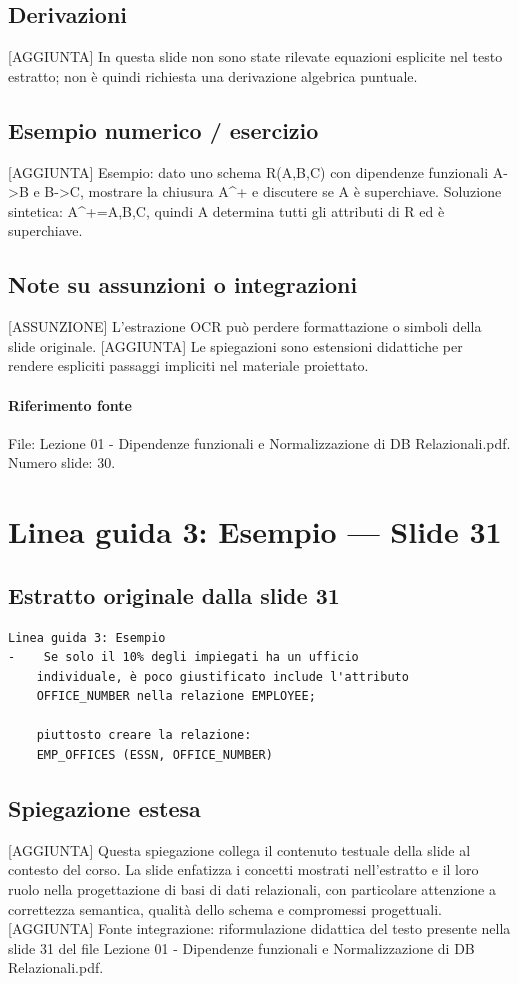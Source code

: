 \documentclass[11pt]{article}
\begin{document}
\subsection*{Derivazioni}
[AGGIUNTA] In questa slide non sono state rilevate equazioni esplicite nel testo estratto; non è quindi richiesta una derivazione algebrica puntuale.
\subsection*{Esempio numerico / esercizio}
[AGGIUNTA] Esempio: dato uno schema R(A,B,C) con dipendenze funzionali A->B e B->C, mostrare la chiusura A^+ e discutere se A è superchiave. Soluzione sintetica: A^+={A,B,C}, quindi A determina tutti gli attributi di R ed è superchiave.
\subsection*{Note su assunzioni o integrazioni}
[ASSUNZIONE] L'estrazione OCR può perdere formattazione o simboli della slide originale.
[AGGIUNTA] Le spiegazioni sono estensioni didattiche per rendere espliciti passaggi impliciti nel materiale proiettato.
\paragraph{Riferimento fonte} File: Lezione 01 - Dipendenze funzionali e Normalizzazione di DB Relazionali.pdf. Numero slide: 30.
\section{Linea guida 3: Esempio --- Slide 31}
\subsection*{Estratto originale dalla slide 31}
\begin{lstlisting}
Linea guida 3: Esempio
-    Se solo il 10% degli impiegati ha un ufficio
    individuale, è poco giustificato include l'attributo
    OFFICE_NUMBER nella relazione EMPLOYEE;

    piuttosto creare la relazione:
    EMP_OFFICES (ESSN, OFFICE_NUMBER)
\end{lstlisting}
\subsection*{Spiegazione estesa}
[AGGIUNTA] Questa spiegazione collega il contenuto testuale della slide al contesto del corso. La slide enfatizza i concetti mostrati nell'estratto e il loro ruolo nella progettazione di basi di dati relazionali, con particolare attenzione a correttezza semantica, qualità dello schema e compromessi progettuali.
[AGGIUNTA] Fonte integrazione: riformulazione didattica del testo presente nella slide 31 del file Lezione 01 - Dipendenze funzionali e Normalizzazione di DB Relazionali.pdf.
\end{document}
